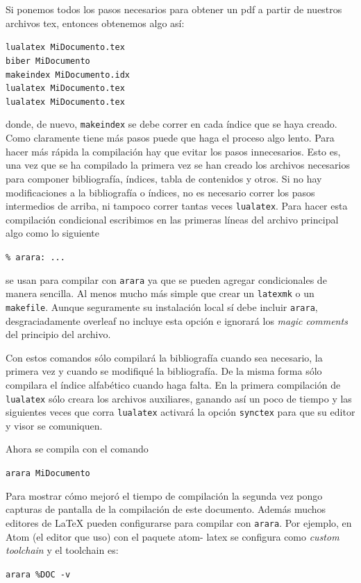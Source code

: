 Si ponemos todos los pasos necesarios para obtener un pdf a partir de nuestros archivos tex, entonces obtenemos algo así:
\begin{flushleft}
  \verb|lualatex MiDocumento.tex|\\
  \verb|biber MiDocumento|\\
  \verb|makeindex MiDocumento.idx|\\
  \verb|lualatex MiDocumento.tex|\\
  \verb|lualatex MiDocumento.tex|
\end{flushleft}
donde, de nuevo, \texttt{makeindex} se debe correr en cada índice que se haya
creado. Como claramente tiene más pasos puede que haga el proceso algo lento.
Para hacer más rápida la compilación hay que evitar los pasos innecesarios.
Esto es, una vez que se ha compilado la primera vez se han creado los
archivos necesarios para componer bibliografía, índices, tabla de contenidos y
otros. Si no hay modificaciones a la bibliografía o índices, no es necesario
correr los pasos intermedios de arriba, ni tampoco correr tantas veces
\texttt{lualatex}. Para hacer esta compilación condicional escribimos
en las primeras líneas del archivo principal algo como lo siguiente
\begin{flushleft}
  \verb|% arara: ...|
\end{flushleft}
se usan para compilar con \texttt{arara} ya que se pueden agregar
condicionales de manera sencilla. Al menos mucho más simple que crear un
\texttt{latexmk} o un \texttt{makefile}. Aunque seguramente su instalación
local sí debe incluir \texttt{arara}, desgraciadamente overleaf no incluye
esta opción e ignorará los \textit{magic comments} del principio del archivo.

Con estos comandos sólo compilará la bibliografía cuando sea necesario, la
primera vez y cuando se modifiqué la bibliografía. De la misma forma sólo
compilara el índice alfabético cuando haga falta. En la primera compilación
de \texttt{lualatex} sólo creara los archivos auxiliares, ganando así un
poco de tiempo y las siguientes veces que corra \texttt{lualatex} activará
la opción \texttt{synctex} para que su editor y visor se comuniquen.

Ahora se compila con el comando
\begin{flushleft}
  \verb|arara MiDocumento|
\end{flushleft}
Para mostrar cómo mejoró el tiempo de compilación la segunda
vez pongo capturas de pantalla de la compilación de este documento.
Además muchos editores de \LaTeX{} pueden configurarse para compilar con
\texttt{arara}.  Por ejemplo, en Atom (el editor que uso) con el paquete atom-
latex se configura como \textit{custom toolchain} y el toolchain es:
\begin{flushleft}
  \verb|arara %DOC -v|
\end{flushleft}

